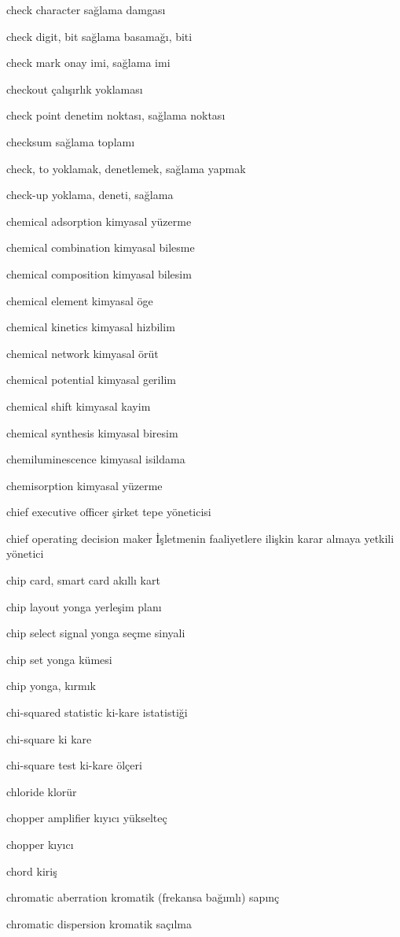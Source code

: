 \documentclass[12pt,fleqn]{article}\usepackage{../../common}
\begin{document}
check character sağlama damgası

check digit, bit sağlama basamağı, biti

check mark onay imi, sağlama imi

checkout çalışırlık yoklaması

check point denetim noktası, sağlama noktası

checksum sağlama toplamı

check, to yoklamak, denetlemek, sağlama yapmak

check-up yoklama, deneti, sağlama

chemical adsorption kimyasal yüzerme

chemical combination kimyasal bilesme

chemical composition kimyasal bilesim

chemical element kimyasal öge

chemical kinetics kimyasal hizbilim

chemical network kimyasal örüt

chemical potential kimyasal gerilim

chemical shift kimyasal kayim

chemical synthesis kimyasal biresim

chemiluminescence kimyasal isildama

chemisorption kimyasal yüzerme

chief executive officer şirket tepe yöneticisi

chief operating decision maker İşletmenin faaliyetlere ilişkin karar almaya yetkili yönetici

chip card, smart card akıllı kart

chip layout yonga yerleşim planı

chip select signal yonga seçme sinyali

chip set yonga kümesi

chip yonga, kırmık

chi-squared statistic ki-kare istatistiği

chi-square ki kare

chi-square test ki-kare ölçeri

chloride klorür

chopper amplifier kıyıcı yükselteç

chopper kıyıcı

chord kiriş

chromatic aberration kromatik (frekansa bağımlı) sapınç

chromatic dispersion kromatik saçılma
\end{document}
